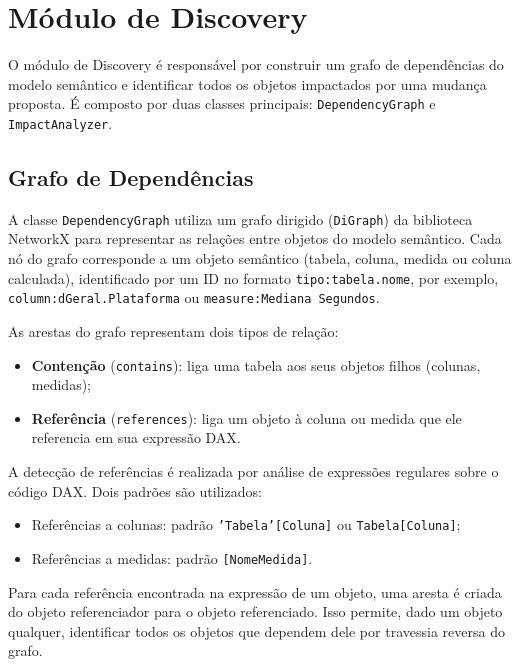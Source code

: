 \documentclass[
    12pt,               %
    openright,          %
    oneside,            %
    a4paper,            %
    chapter=TITLE,      %
    section=TITLE,      %
    brazil              %
]{abntex2}
\begin{document}
\section{Módulo de Discovery}

O módulo de Discovery é responsável por construir um grafo de dependências do modelo semântico e identificar todos os objetos impactados por uma mudança proposta. É composto por duas classes principais: \texttt{DependencyGraph} e \texttt{ImpactAnalyzer}.

\subsection{Grafo de Dependências}

A classe \texttt{DependencyGraph} utiliza um grafo dirigido (\texttt{DiGraph}) da biblioteca NetworkX para representar as relações entre objetos do modelo semântico. Cada nó do grafo corresponde a um objeto semântico (tabela, coluna, medida ou coluna calculada), identificado por um ID no formato \texttt{tipo:tabela.nome}, por exemplo, \texttt{column:dGeral.Plataforma} ou \texttt{measure:Mediana Segundos}.

As arestas do grafo representam dois tipos de relação:

\begin{itemize}
    \item \textbf{Contenção} (\texttt{contains}): liga uma tabela aos seus objetos filhos (colunas, medidas);
    \item \textbf{Referência} (\texttt{references}): liga um objeto à coluna ou medida que ele referencia em sua expressão DAX.
\end{itemize}

A detecção de referências é realizada por análise de expressões regulares sobre o código DAX. Dois padrões são utilizados:

\begin{itemize}
    \item Referências a colunas: padrão \texttt{'Tabela'[Coluna]} ou \texttt{Tabela[Coluna]};
    \item Referências a medidas: padrão \texttt{[NomeMedida]}.
\end{itemize}

Para cada referência encontrada na expressão de um objeto, uma aresta é criada do objeto referenciador para o objeto referenciado. Isso permite, dado um objeto qualquer, identificar todos os objetos que dependem dele por travessia reversa do grafo.
\end{document}
